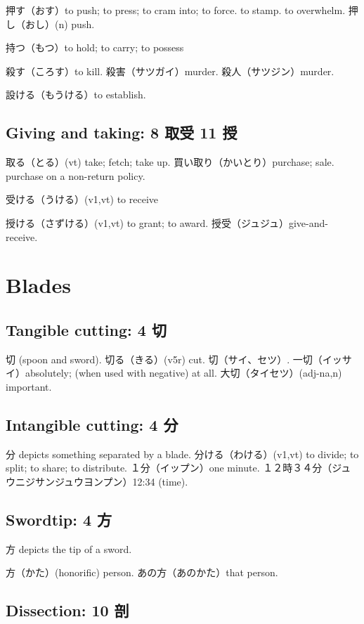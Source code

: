 押す（おす）to push; to press; to cram into; to force.
to stamp.
to overwhelm.
押し（おし）(n) push.

持つ（もつ）to hold; to carry; to possess

殺す（ころす）to kill.
殺害（サツガイ）murder.
殺人（サツジン）murder.

設ける（もうける）to establish.

\subsection{Giving and taking: 8 取受 11 授}

取る（とる）(vt) take; fetch; take up.
買い取り（かいとり）purchase; sale. purchase on a non-return policy.

受ける（うける）(v1,vt) to receive

授ける（さずける）(v1,vt) to grant; to award.
授受（ジュジュ）give-and-receive.

\section{Blades}

\subsection{Tangible cutting: 4 切}

切 (spoon and sword).
切る（きる）(v5r) cut.
切（サイ、セツ）.
一切（イッサイ）absolutely; (when used with negative) at all.
大切（タイセツ）(adj-na,n) important.

\subsection{Intangible cutting: 4 分}

分 depicts something separated by a blade.
分ける（わける）(v1,vt) to divide; to split; to share; to distribute.
１分（イップン）one minute.
１２時３４分（ジュウニジサンジュウヨンプン）12:34 (time).

\subsection{Swordtip: 4 方}

方 depicts the tip of a sword.

方（かた）(honorific) person.
あの方（あのかた）that person.

\subsection{Dissection: 10 剖}

